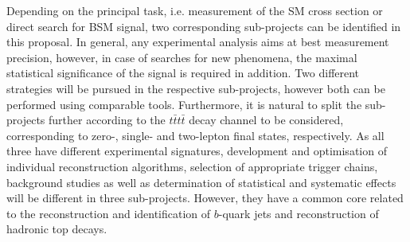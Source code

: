 \textcolor{\mycolor}{
Depending on the principal task, i.e. measurement of the SM cross section or direct search for BSM signal, two corresponding sub-projects can be identified in this proposal. In general, any experimental analysis aims at best measurement precision, however, in case of searches for new phenomena, the maximal statistical significance of the signal is required in addition.
%
Two different strategies will be pursued in the respective sub-projects, however both can be performed using comparable tools. Furthermore, it is natural to split the sub-projects further according to the $t\bar{t}t\bar{t}$ decay channel to be considered, corresponding to zero-, single- and two-lepton final states, respectively. As all three have different experimental signatures, development and optimisation of individual reconstruction algorithms, selection of appropriate trigger chains, background studies as well as determination of statistical and systematic effects will be different in three sub-projects. However, they have a common core related to the reconstruction and identification of $b$-quark jets and reconstruction of hadronic top decays.}

